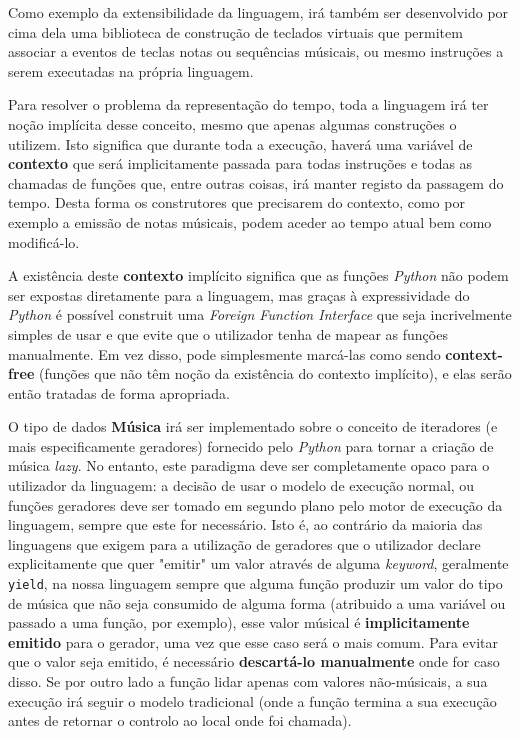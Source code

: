 Como exemplo da extensibilidade da linguagem, irá também ser desenvolvido por cima dela uma biblioteca de construção de teclados virtuais que permitem associar a eventos de teclas notas ou sequências músicais, ou mesmo instruções a serem executadas na própria linguagem.

Para resolver o problema da representação do tempo, toda a linguagem irá ter noção implícita desse conceito, mesmo que apenas algumas construções o utilizem. Isto significa que durante toda a execução, haverá uma variável de \textbf{contexto} que será implicitamente passada para todas instruções e todas as chamadas de funções que, entre outras coisas, irá manter registo da passagem do tempo. Desta forma os construtores que precisarem do contexto, como por exemplo a emissão de notas músicais, podem aceder ao tempo atual bem como modificá-lo.

A existência deste \textbf{contexto} implícito significa que as funções \textit{Python} não podem ser expostas diretamente para a linguagem, mas graças à expressividade do \textit{Python} é possível construit uma \textit{Foreign Function Interface} que seja incrivelmente simples de usar e que evite que o utilizador tenha de mapear as funções manualmente. Em vez disso, pode simplesmente marcá-las como sendo \textbf{context-free} (funções que não têm noção da existência do contexto implícito), e elas serão então tratadas de forma apropriada.

O tipo de dados \textbf{Música} irá ser implementado sobre o conceito de iteradores (e mais especificamente geradores) fornecido pelo \textit{Python} para tornar a criação de música \textit{lazy}. No entanto, este paradigma deve ser completamente opaco para o utilizador da linguagem: a decisão de usar o modelo de execução normal, ou funções geradores deve ser tomado em segundo plano pelo motor de execução da linguagem, sempre que este for necessário. Isto é, ao contrário da maioria das linguagens que exigem para a utilização de geradores que o utilizador declare explicitamente que quer "emitir" um valor através de alguma \textit{keyword}, geralmente \texttt{yield}, na nossa linguagem sempre que alguma função produzir um valor do tipo de música que não seja consumido de alguma forma (atribuido a uma variável ou passado a uma função, por exemplo), esse valor músical é \textbf{implicitamente emitido} para o gerador, uma vez que esse caso será o mais comum. Para evitar que o valor seja emitido, é necessário \textbf{descartá-lo manualmente} onde for caso disso. Se por outro lado a função lidar apenas com valores não-músicais, a sua execução irá seguir o modelo tradicional (onde a função termina a sua execução antes de retornar o controlo ao local onde foi chamada).
\newpage
